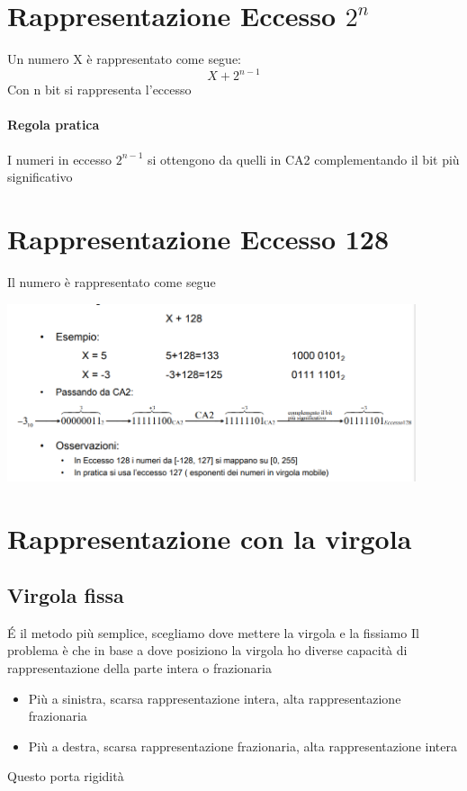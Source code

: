 \documentclass[12pt, a4paper, openany]{book}
\begin{document}
\section*{Rappresentazione Eccesso $2^n$}
Un numero X è rappresentato come segue:
\begin{equation}
    X+2^{n-1}
\end{equation}
Con n bit si rappresenta l'eccesso
\paragraph{Regola pratica} I numeri in eccesso $2^{n-1}$ si ottengono da quelli in CA2
complementando il bit più significativo
\section{Rappresentazione Eccesso 128}
Il numero è rappresentato come segue
\begin{center}
    \includegraphics[width=120mm, scale=0.6]{eccesso128.png}
\end{center}

\section{Rappresentazione con la virgola}
\subsection{Virgola fissa}
\'E il metodo più semplice, scegliamo dove mettere la virgola e la fissiamo
Il problema è che in base a dove posiziono la virgola ho diverse capacità di rappresentazione della parte intera o frazionaria
\begin{itemize}
    \item Più a sinistra, scarsa rappresentazione intera, alta rappresentazione frazionaria
    \item Più a destra, scarsa rappresentazione frazionaria, alta rappresentazione intera
\end{itemize}
Questo porta rigidità
\end{document}
